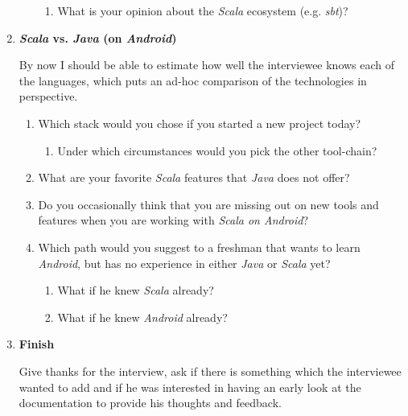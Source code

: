 \begin{enumerate}
\begin{enumerate}
\begin{enumerate}
			\item What is your opinion about the \textit{Scala} ecosystem (e.g. \textit{sbt})?

		\end{enumerate}

	\end{enumerate}

	\item \textbf{\textit{Scala} vs. \textit{Java} (on \textit{Android})}

	By now I should be able to estimate how well the interviewee knows each of the languages, which puts an ad-hoc comparison of the technologies in perspective.

	\begin{enumerate}

		\item Which stack would you chose if you started a new project today?

		\begin{enumerate}

			\item Under which circumstances would you pick the other tool-chain?

		\end{enumerate}

		\item What are your favorite \textit{Scala} features that \textit{Java} does not offer?

		\item Do you occasionally think that you are missing out on new tools and features when you are working with \textit{Scala on Android}?

		\item Which path would you suggest to a freshman that wants to learn \textit{Android}, but has no experience in either \textit{Java} or \textit{Scala} yet?

		\begin{enumerate}

			\item What if he knew \textit{Scala} already?

			\item What if he knew \textit{Android} already?

		\end{enumerate}

	\end{enumerate}

	\item \textbf{Finish}

	Give thanks for the interview, ask if there is something which the interviewee wanted to add and if he was interested in having an early look at the documentation to provide his thoughts and feedback.

\end{enumerate}

